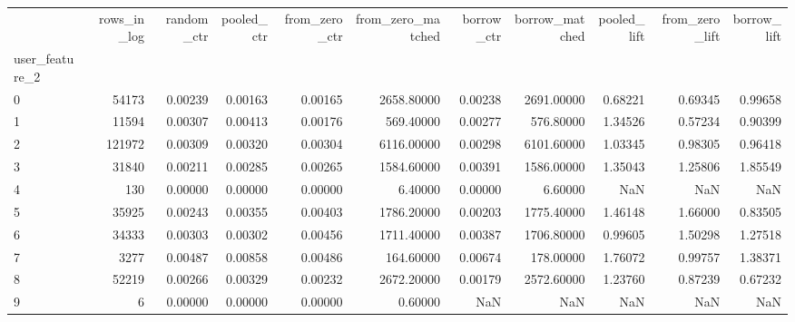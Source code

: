 \begin{tabular}{lrrrrrrrrrr}
\toprule
 & rows\_in\_log & random\_ctr & pooled\_ctr & from\_zero\_ctr & from\_zero\_matched & borrow\_ctr & borrow\_matched & pooled\_lift & from\_zero\_lift & borrow\_lift \\
user\_feature\_2 &  &  &  &  &  &  &  &  &  &  \\
\midrule
0 & 54173 & 0.00239 & 0.00163 & 0.00165 & 2658.80000 & 0.00238 & 2691.00000 & 0.68221 & 0.69345 & 0.99658 \\
1 & 11594 & 0.00307 & 0.00413 & 0.00176 & 569.40000 & 0.00277 & 576.80000 & 1.34526 & 0.57234 & 0.90399 \\
2 & 121972 & 0.00309 & 0.00320 & 0.00304 & 6116.00000 & 0.00298 & 6101.60000 & 1.03345 & 0.98305 & 0.96418 \\
3 & 31840 & 0.00211 & 0.00285 & 0.00265 & 1584.60000 & 0.00391 & 1586.00000 & 1.35043 & 1.25806 & 1.85549 \\
4 & 130 & 0.00000 & 0.00000 & 0.00000 & 6.40000 & 0.00000 & 6.60000 & NaN & NaN & NaN \\
5 & 35925 & 0.00243 & 0.00355 & 0.00403 & 1786.20000 & 0.00203 & 1775.40000 & 1.46148 & 1.66000 & 0.83505 \\
6 & 34333 & 0.00303 & 0.00302 & 0.00456 & 1711.40000 & 0.00387 & 1706.80000 & 0.99605 & 1.50298 & 1.27518 \\
7 & 3277 & 0.00487 & 0.00858 & 0.00486 & 164.60000 & 0.00674 & 178.00000 & 1.76072 & 0.99757 & 1.38371 \\
8 & 52219 & 0.00266 & 0.00329 & 0.00232 & 2672.20000 & 0.00179 & 2572.60000 & 1.23760 & 0.87239 & 0.67232 \\
9 & 6 & 0.00000 & 0.00000 & 0.00000 & 0.60000 & NaN & NaN & NaN & NaN & NaN \\
\bottomrule
\end{tabular}
